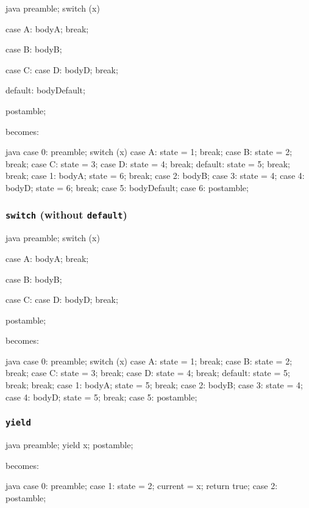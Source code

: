 \documentclass[journal,a4paper]{IEEEtran}
\begin{document}
\begin{pygmented}{java}
preamble;
switch (x) {
    case A:
        bodyA;
        break;

    case B:
        bodyB;

    case C:
    case D:
        bodyD;
        break;

    default:
        bodyDefault;
}
postamble;
\end{pygmented}

becomes:

\begin{pygmented}{java}
case 0:
    preamble;
    switch (x) {
        case A:
            state = 1;
            break;
        case B:
            state = 2;
            break;
        case C:
            state = 3;
        case D:
            state = 4;
            break;
        default:
            state = 5;
            break;
    }
    break;
case 1:
    bodyA;
    state = 6;
    break;
case 2:
    bodyB;
case 3:
    state = 4;
case 4:
    bodyD;
    state = 6;
    break;
case 5:
    bodyDefault;
case 6:
    postamble;
\end{pygmented}


\subsubsection{\texttt{switch} (without \texttt{default})}

\begin{pygmented}{java}
preamble;
switch (x) {
    case A:
        bodyA;
        break;

    case B:
        bodyB;

    case C:
    case D:
        bodyD;
        break;
}
postamble;
\end{pygmented}

becomes:

\begin{pygmented}{java}
case 0:
    preamble;
    switch (x) {
        case A:
            state = 1;
            break;
        case B:
            state = 2;
            break;
        case C:
            state = 3;
            break;
        case D:
            state = 4;
            break;
        default:
            state = 5;
            break;
    }
    break;
case 1:
    bodyA;
    state = 5;
    break;
case 2:
    bodyB;
case 3:
    state = 4;
case 4:
    bodyD;
    state = 5;
    break;
case 5:
    postamble;
\end{pygmented}

\subsubsection{\texttt{yield}}

\begin{pygmented}{java}
preamble;
yield x;
postamble;
\end{pygmented}

becomes:

\begin{pygmented}{java}
case 0:
    preamble;
case 1:
    state = 2;
    current = x;
    return true;
case 2:
    postamble;
\end{pygmented}
\end{document}
